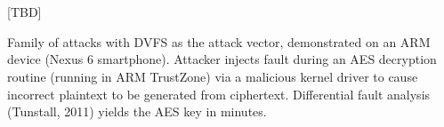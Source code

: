\section{\clkscrew{}}

[TBD]

Family of attacks with DVFS as the attack vector, demonstrated on an ARM device
(Nexus 6 smartphone).
Attacker injects fault during an AES decryption routine (running in ARM
TrustZone) via a malicious kernel driver to cause incorrect plaintext to be
generated from ciphertext.
Differential fault analysis (Tunstall, 2011) yields the AES key in minutes.
